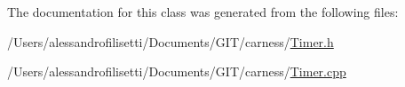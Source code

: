 The documentation for this class was generated from the following files\+:\begin{DoxyCompactItemize}
\item 
/\+Users/alessandrofilisetti/\+Documents/\+G\+I\+T/carness/\hyperlink{a00123}{Timer.\+h}\item 
/\+Users/alessandrofilisetti/\+Documents/\+G\+I\+T/carness/\hyperlink{a00122}{Timer.\+cpp}\end{DoxyCompactItemize}

